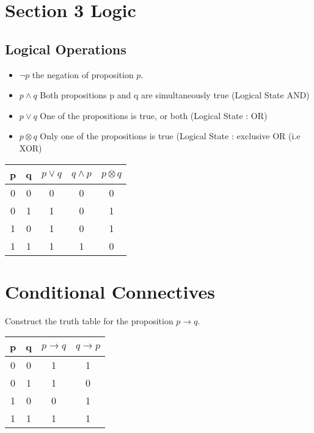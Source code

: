 \documentclass{beamer}
\begin{document}
\newpage
\section{Section 3 Logic}
\subsection{Logical Operations}
\begin{itemize}
\item $\neg p$ the negation of proposition $p$.
\item $p \wedge q$ Both propositions p and q are simultaneously true (Logical State AND)
\item $p \vee q $ One of the propositions is true, or both (Logical State : OR)
\item $p \otimes q$ Only one of the propositions is true (Logical State : exclusive OR (i.e XOR)
\end{itemize}
\begin{center}
\begin{tabular}{|c|c|c|c|c|}
\hline
p & q & $p \vee q$ & $q \wedge p$ & $p \otimes q$ \\
\hline
0 & 0 & 0 & 0 & 0 \\
0 & 1 & 1 & 0 & 1\\
1 & 0 & 1 & 0 & 1 \\
1 & 1 & 1 & 1 & 0\\
\hline
\end{tabular}
\end{center}
\section{Conditional Connectives}
Construct the truth table for the proposition $p \rightarrow q$.

\begin{center}
\begin{tabular}{|c|c|c|c|}
\hline
p & q & $p \rightarrow q$ & $q \rightarrow p$ \\
\hline
0 & 0 & 1& 1 \\
0 & 1 & 1 & 0 \\
1 & 0 & 0 & 1 \\
1 & 1 & 1 & 1 \\
\hline
\end{tabular}
\end{center}
\end{document}
